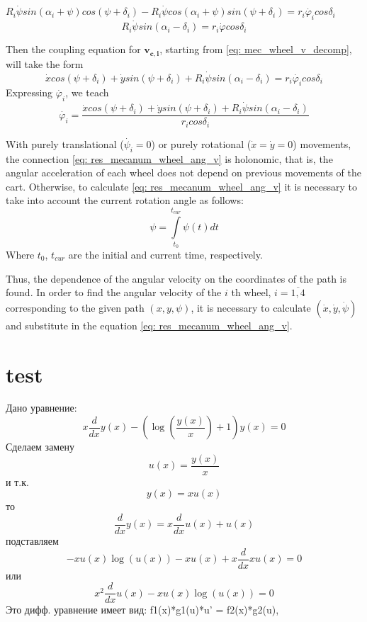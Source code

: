 \documentclass[oneside,final,14pt]{extreport}
\newcommand{\bs}{\boldsymbol}
\begin{document}
$
R_{i}
\dot{\psi}
sin (\alpha_{i} + \psi)
cos (\psi + \delta_{i})
-
R_{i}
\dot{\psi}
cos (\alpha_{i} + \psi)
sin (\psi + \delta_{i})
=
r_{i} \dot{\varphi_{i}}
cos \delta_{i}
$
\begin{equation}
R_{i}
\dot{\psi}
sin (\alpha_{i} - \delta_{i})
=
r_{i}
\dot{\varphi}
cos \delta_{i}
\end{equation}

Then the coupling equation for $ \bs{v_{c, i}} $, starting from \ref{eq: mec_wheel_v_decomp}, will take the form
\begin{equation}
\label{eq: res_mecanum_wheel_car}
\dot{x}
cos (\psi + \delta_{i})
+
\dot{y}
sin (\psi + \delta_{i})
+
R_{i}
\dot{\psi}
sin (\alpha_{i} - \delta_{i})
=
r_{i} \dot{\varphi_{i}}
cos \delta_{i}
\end{equation}
Expressing $ \dot{\varphi_{i}} $, we teach
\begin{equation}
\label{eq: res_mecanum_wheel_ang_v}
\dot{\varphi_{i}}
=
\frac{
\dot{x}
cos (\psi + \delta_{i})
+
\dot{y}
sin (\psi + \delta_{i})
+
R_{i}
\dot{\psi}
sin (\alpha_{i} - \delta_{i})
}
{
r_{i} cos \delta_{i}
}
\end{equation}

With purely translational ($ \dot{\psi_{i}} = 0 $) or purely rotational ($ \dot{x} = \dot{y} = 0 $) movements, the connection \ref{eq: res_mecanum_wheel_ang_v} is holonomic, that is, the angular acceleration of each wheel does not depend on previous movements of the cart. Otherwise, to calculate \ref{eq: res_mecanum_wheel_ang_v} it is necessary to take into account the current rotation angle as follows:
\begin{equation}
\psi
=
\int \limits_{t_{0}} ^{t_{cur}} \psi (t) dt
\end{equation}
Where $ t_{0} $, $ t_{cur} $ are the initial and current time, respectively.

Thus, the dependence of the angular velocity on the coordinates of the path is found. In order to find the angular velocity of the $ i $ th wheel, $ i = \overline{1,4} $ corresponding to the given path $ (x, y, \psi) $, it is necessary to calculate $ (\dot{x}, \dot{y}, \dot{\psi}) $ and substitute in the equation \ref{eq: res_mecanum_wheel_ang_v}.

\chapter{test}
Дано уравнение:
$$x \frac{d}{d x} y{\left(x \right)} - \left(\log{\left(\frac{y{\left(x \right)}}{x} \right)} + 1\right) y{\left(x \right)} = 0$$
Сделаем замену
$$u{\left(x \right)} = \frac{y{\left(x \right)}}{x}$$
и т.к.
$$y{\left(x \right)} = x u{\left(x \right)}$$
то
$$\frac{d}{d x} y{\left(x \right)} = x \frac{d}{d x} u{\left(x \right)} + u{\left(x \right)}$$
подставляем
$$- x u{\left(x \right)} \log{\left(u{\left(x \right)} \right)} - x u{\left(x \right)} + x \frac{d}{d x} x u{\left(x \right)} = 0$$
или
$$x^{2} \frac{d}{d x} u{\left(x \right)} - x u{\left(x \right)} \log{\left(u{\left(x \right)} \right)} = 0$$
Это дифф. уравнение имеет вид:
f1(x)*g1(u)*u' = f2(x)*g2(u),
\end{document}
